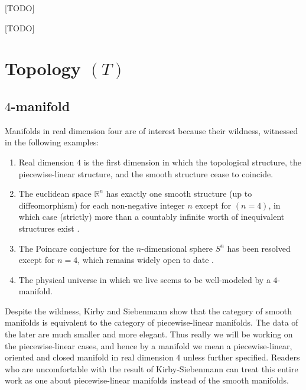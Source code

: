 \begin{proposition}
\end{proposition}

\begin{definition}[$10$j-symbol]\label{def/10j-symbol}
  [TODO]
\end{definition}

\begin{definition}[$15$j-symbol]\label{def/15j-symbol}
  [TODO]
\end{definition}


\section{Topology $(T)$}
\subsection{$4$-manifold}
Manifolds in real dimension four are of interest because their
wildness, witnessed in the following examples:

\begin{enumerate}
  \item Real dimension $4$ is the first dimension in which the
        topological structure, the piecewise-linear structure,
        and the smooth structure cease to coincide.
  \item The euclidean space $\mathbb{R}^{n}$ has exactly one
        smooth structure (up to diffeomorphism) for each
        non-negative integer $n$ except for $(n=4)$, in which
        case (strictly) more than a countably infinite worth of
        inequivalent structures exist \cite{?}.
  \item The Poincare conjecture for the $n$-dimensional sphere
        $S^{n}$ has been resolved except for $n=4$, which remains
        widely open to date \cite{?}.
  \item The physical universe in which we live seems to be
        well-modeled by a $4$-manifold.
\end{enumerate}

\noindent Despite the wildness, Kirby and Siebenmann
\cite{kirby-siebenmann} \cite{turaev-qiok-3-manifolds} show that
the category of smooth manifolds is equivalent to the category of
piecewise-linear manifolds. The data of the later are much
smaller and more elegant. Thus really we will be working on the
piecewise-linear cases, and hence by a manifold we mean a
piecewise-linear, oriented and closed manifold in real dimension
$4$ unless further specified. Readers who are uncomfortable with
the result of Kirby-Siebenmann can treat this entire work as one
about piecewise-linear manifolds instead of the smooth manifolds.

